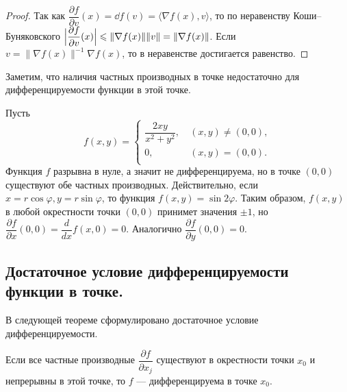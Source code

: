 \documentclass[a4paper]{article}
\theoremstyle{named}
\begin{document}
    \begin{proof}
        Так как $\dfrac{\partial f}{\partial v}(x) = \dd f(v) = \langle\nabla f(x), v\rangle$,
        то по неравенству Коши--Буняковского $\Bigl|\dfrac{\partial f}{\partial v}(x)\Bigr|\leq \|\nabla f(x)\|\|v\|
        =\|\nabla f(x)\|$. Если $v=\|\nabla f(x)\|^{-1}\nabla f(x)$, то в неравенстве достигается равенство.
    \end{proof}

    Заметим, что наличия частных производных в точке недостаточно для дифференцируемости функции в этой точке.

    \begin{example*}
        Пусть
        $$
            f(x,y)=
            \left\{
            \begin{aligned}
                \dfrac{2xy}{x^2+y^2}, &\ (x,y)\ne(0,0), \\
                0, &\ (x,y)=(0,0).\\
            \end{aligned}
            \right.
        $$
        Функция $f$ разрывна в нуле, а значит не дифференцируема, но в точке $(0,0)$ существуют обе частных производных.
        Действительно, если $x=r\cos\varphi, y=r\sin\varphi$, то функция $f(x,y) = \sin2\varphi$. Таким образом, $f(x,y)$ в любой окрестности точки $(0,0)$ принимет значения $\pm1$, но $\dfrac{\partial f}{\partial x}(0,0) = \dfrac{d}{dx}f(x,0) = 0$.
        Аналогично $\dfrac{\partial f}{\partial y}(0,0)=0$.
    \end{example*}

    \subsection{Достаточное условие дифференцируемости функции в точке.}

    В следующей теореме сформулировано достаточное условие дифференцируемости.

    \begin{theorem*}
        Если все частные производные $\dfrac{\partial f}{\partial x_j}$ существуют в окрестности точки $x_0$ и непрерывны в этой точке, то $f$ --- дифференцируема в точке $x_0$.
    \end{theorem*}
\end{document}
